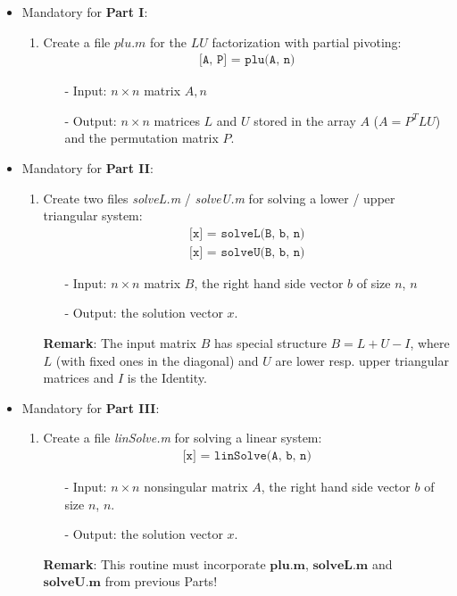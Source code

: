 \documentclass{scrartcl}
\begin{document}
\begin{enumerate}
\begin{itemize}
		\item Mandatory for \textbf{Part I}:
			\begin{enumerate}
				\item Create a file $plu.m$ for the $LU$ factorization with partial pivoting:
        		\begin{align*}        	 
        			\texttt{[A, P] = plu(A, n)}
				\end{align*}
        		\begin{itemize}
            		\item[-] Input: $n \times n$ matrix $A, n$
            		\item[-] Output: $n \times n$ matrices $L$ and $U$ stored in the array $A$ ($A=P^TLU$) and the permutation matrix $P$.\\
        		\end{itemize}
        	\end{enumerate}

		\item Mandatory for \textbf{Part II}:
			\begin{enumerate}
				\item Create two files \textit{solveL.m} / \textit{solveU.m} for solving a lower / upper triangular system:
            	\begin{align*}
            		\texttt{[x] = solveL(B, b, n)}\\
					\texttt{[x] = solveU(B, b, n)}
				\end{align*}
        		\begin{itemize}
            		\item[-] Input: $n \times n$ matrix $B$, the right hand side vector $b$ of size $n$, $n$
            		\item[-] Output: the solution vector $x$.
        		\end{itemize}
		\textbf{Remark}: The input matrix $B$ has special structure $B = L + U - I$, where $L$ (with fixed ones in the diagonal) and $U$ are lower resp. upper triangular matrices and $I$ is the Identity.\\
			\end{enumerate}

		\item Mandatory for \textbf{Part III}:
		 \begin{enumerate}
		 	\item Create a file \textit{linSolve.m} for solving a linear system:
		 	\begin{align*}
				\texttt{[x] = linSolve(A, b, n)}
			\end{align*}
			\begin{itemize}
				\item[-] Input: $n \times n$ nonsingular matrix $A$, the right hand side vector $b$ of size $n$, $n$.
            	\item[-] Output: the solution vector $x$.        	
        	\end{itemize}
\textbf{Remark}: This routine must incorporate $\textbf{plu.m}$, $\textbf{solveL.m}$ and $\textbf{solveU.m}$ from previous Parts!\\
		\end{enumerate}
	\end{itemize}


\end{enumerate}
\end{document}
